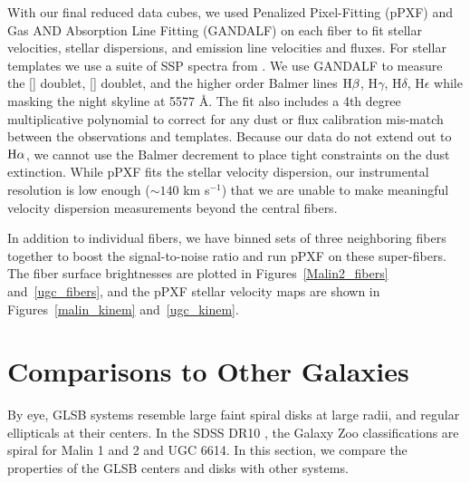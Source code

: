 \documentclass[12pt,preprint]{aastex}
\def\arcsec{$^{\prime\prime}$}
\newcommand\kms{km s$^{-1}$}
\newcommand\ha{$\rm{H}\alpha$}
\newcommand\hb{$\rm{H}\beta$}
\begin{document}
With our final reduced data cubes, we used Penalized Pixel-Fitting (pPXF) \citep{Cappellari04} and Gas AND Absorption Line Fitting (GANDALF) \citep{Sarzi06} on each fiber to fit stellar velocities, stellar dispersions, and emission line velocities and fluxes.  For stellar templates we use a suite of SSP spectra from \citet{Bruzual03}.  We use GANDALF to measure the [] doublet, [] doublet, and the higher order Balmer lines \hb, H$\gamma$, H$\delta$, H$\epsilon$ while masking the night skyline at 5577 \AA.  The fit also includes a 4th degree multiplicative polynomial to correct for any dust or flux calibration mis-match between the observations and templates.  Because our data do not extend out to \ha, we cannot use the Balmer decrement to place tight constraints on the dust extinction.  While pPXF fits the stellar velocity dispersion, our instrumental resolution is low enough ($\sim140$ \kms) that we are unable to make meaningful velocity dispersion measurements beyond the central fibers.  

In addition to individual fibers, we have binned sets of three neighboring fibers together to boost the signal-to-noise ratio and run pPXF on these super-fibers. The fiber surface brightnesses are plotted in Figures~\ref{Malin2_fibers} and~\ref{ugc_fibers}, and the pPXF stellar velocity maps are shown in Figures~\ref{malin_kinem} and~\ref{ugc_kinem}.









\section{Comparisons to Other Galaxies}

By eye, GLSB systems resemble large faint spiral disks at large radii, and regular ellipticals at their centers.  In the SDSS DR10 \citep{Ahn14}, the Galaxy Zoo classifications \citep{Willett13} are spiral for Malin 1 and 2 and UGC 6614.  In this section, we compare the properties of the GLSB centers and disks with other systems.  
\end{document}
